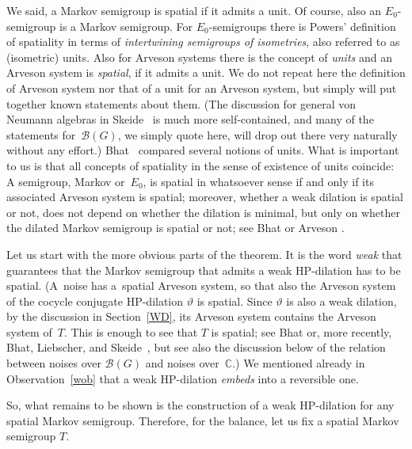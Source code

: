 \documentclass[pdftex]{sigma}%
\newcommand{\eus}[1]{\mathscr{#1}}
\newcommand{\bb}[1]{\mathbb{#1}}
\newcommand{\vt}{\vartheta}
\newcommand{\C}{\bb{C}}
\newcommand{\sB}{\eus{B}}
\numberwithin{equation}{section}
\begin{document}
We said, a Markov semigroup is spatial if it admits a unit. Of course, also an $E_0$-semigroup is a Markov semigroup. For $E_0$-semigroups there is Powers' definition \cite{Pow87} of spatiality in terms of {\it intertwining semigroups of isometries}, also referred to as (isometric) units. Also for Arveson systems there is the concept of {\it units} and an Arveson system is \emph{spatial}, if it admits a unit. We do not repeat here the definition of Arveson system nor that of a unit for an Arveson system, but simply will put together known statements about them. (The discussion for general von Neumann algebras in Skeide~\cite{Ske16} is much more self-contained, and many of the statements for~$\sB(G)$, we simply quote here, will drop out there very naturally without any effort.) Bhat~\cite[Section~6]{Bha01} compared several notions of units. What is important to us is that all concepts of spatiality in the sense of existence of units coincide: A semigroup, Markov or~$E_0$, is spatial in whatsoever sense if and only if its associated Arveson system is spatial; moreover, whether a weak dilation is spatial or not, does not depend on whether the dilation is minimal, but only on whether the dilated Markov semigroup is spatial or not; see Bhat \cite[Section~6]{Bha01} or Arveson \cite[Sections~8.9 and~8.10]{Arv03}.

Let us start with the more obvious parts of the theorem. It is the word {\it weak} that guarantees that the Markov semigroup that admits a weak HP-dilation has to be spatial. (A~noise has a~spatial Arveson system, so that also the Arveson system of the cocycle conjugate HP-dilation $\vt$ is spatial. Since $\vt$ is also a weak dilation, by the discussion in Section~\ref{WD}, its Arveson system contains the Arveson system of~$T$. This is enough to see that $T$ is spatial; see Bhat \cite[Section~6]{Bha01} or, more recently, Bhat, Liebscher, and Skeide~\cite{BLS10}, but see also the discussion below of the relation between noises over $\sB(G)$ and noises over~$\C$.) We mentioned already in Observation~\ref{wob} that a weak HP-dilation {\it embeds} into a reversible one.

So, what remains to be shown is the construction of a weak HP-dilation for any spatial Markov semigroup. Therefore, for the balance, let us fix a spatial Markov semigroup $T$.
\end{document}
